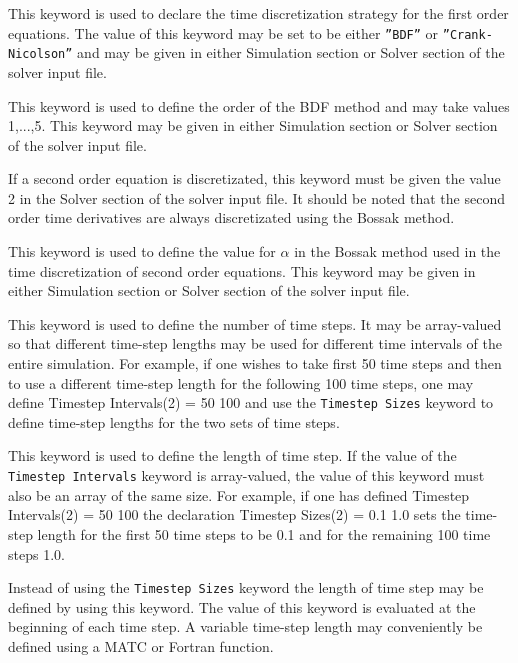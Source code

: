 \sifbegin
{}
This keyword is used to declare the time discretization strategy for the 
first order equations. The value of this keyword may be set to be either {\tt ''BDF''}
or {\tt ''Crank-Nicolson''} and may be given in 
either Simulation section or Solver section of the solver input file.

This keyword is used to define the order of the BDF method and may take 
values 1,...,5. This keyword may be given in either Simulation section or 
Solver section of the solver input file.

If a second order equation is discretizated,
this keyword must be given the value 2 in the Solver section of the solver input
file. It should be noted that the second order time derivatives are always discretizated 
using the Bossak method.

This keyword is used to define the value for $\alpha$ in the Bossak method used
in the time discretization of second order equations.
This keyword may be given in either Simulation section or Solver section
of the solver input file.

This keyword is used to define the number of time steps. 
It may be array-valued so that different time-step lengths may be used
for different time intervals of the entire simulation. For example,  
if one wishes to take first 50 time steps and then to use a
different time-step length for the following 100 time steps, one may     
define
\ttbegin
Timestep Intervals(2) = 50 100
\ttend
and use the {\tt Timestep Sizes} keyword to define time-step lengths for 
the two sets of time steps. 

This keyword is used to define the length of time step. 
If the value of the {\tt Timestep Intervals} keyword is array-valued,
the value of this keyword must also be an array of the same size.      
For example, if one has defined
\ttbegin
Timestep Intervals(2) = 50 100
\ttend
the declaration
\ttbegin
Timestep Sizes(2) = 0.1 1.0
\ttend
sets the time-step length for the first 50 time steps to be 0.1 and for the remaining
100 time steps 1.0.

Instead of using the {\tt Timestep Sizes} keyword the length of time step
may be defined by using this keyword.  The value of this keyword is evaluated
at the beginning of each time step. A variable time-step length may conveniently be 
defined using a MATC or Fortran function. 

